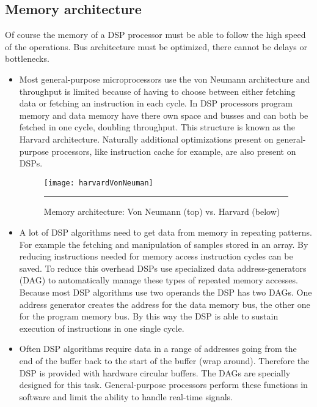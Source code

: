 \subsection{Memory architecture}
Of course the memory of a DSP processor must be able to follow the high speed of the operations. Bus architecture must be optimized, there cannot be delays or bottlenecks. 
\begin{itemize}
\item Most general-purpose microprocessors use the von Neumann architecture and throughput is limited because of having to choose between either fetching data or fetching an instruction in each cycle. In DSP processors program memory and data memory have there own space and busses and can both be fetched in one cycle, doubling throughput. This structure is known as the Harvard architecture. Naturally additional optimizations  present on general-purpose processors, like instruction cache for example, are also present on DSPs.
\begin{figure}[htbp]
\centering
\texttt{[image: harvardVonNeuman]}
\rule{30em}{0.5pt}
\caption[Harvard vs. Von Neuman]{Memory architecture: Von Neumann (top) vs. Harvard (below)}
\label{fig:harvardVonNeumann}
\end{figure}
\item A lot of DSP algorithms need to get data from memory in repeating patterns. For example the fetching and manipulation of samples stored in an array. By reducing instructions needed for memory access instruction cycles can be saved. To reduce this overhead DSPs use specialized data address-generators (DAG) to automatically manage these types of repeated memory accesses. 
Because most DSP algorithms use two operands the DSP has two DAGs. One address generator creates the address for the data memory bus, the other one for the program memory bus. By this way the DSP is able to sustain execution of instructions in one single cycle.
\item Often DSP algorithms require data in a range of addresses going from the end of the buffer back to the start of the buffer (wrap around). Therefore the DSP is provided with hardware circular buffers. The DAGs are specially designed for this task. General-purpose processors perform these functions in software and limit the ability to handle real-time signals.
\end{itemize}  

